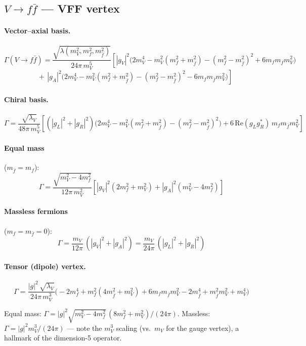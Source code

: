 \documentclass[11pt,a4paper]{article}
\newcommand{\la}{\lambda}
\newcommand{\beq}{\begin{equation}}
\newcommand{\eeq}{\end{equation}}
\newcommand{\conj}[1]{#1^{*}}
\begin{document}
\subsection{$V \to f\bar{f}$ --- VFF vertex}
\label{sec:V-ff}

\paragraph{Vector--axial basis.}
\beq
\boxed{
\Gamma(V\to f\bar{f}) = \frac{\sqrt{\la(m_V^2,m_f^2,m_{\bar{f}}^2)}}{24\pi\, m_V^5}
\left[|g_V|^2\bigl(2m_V^4-m_V^2(m_f^2+m_{\bar f}^2)-(m_f^2-m_{\bar f}^2)^2+6m_f m_{\bar f} m_V^2\bigr)
\right.}
\eeq
\beq
\boxed{
\left.\quad
+\,|g_A|^2\bigl(2m_V^4-m_V^2(m_f^2+m_{\bar f}^2)-(m_f^2-m_{\bar f}^2)^2-6m_f m_{\bar f} m_V^2\bigr)
\right]
}
\label{eq:V-ff-va}
\eeq

\paragraph{Chiral basis.}
\beq
\Gamma = \frac{\sqrt{\la_V}}{48\pi\, m_V^5}
\!\left[(|g_L|^2\!+\!|g_R|^2)\bigl(2m_V^4\!-\!m_V^2(m_f^2\!+\!m_{\bar f}^2)\!-\!(m_f^2\!-\!m_{\bar f}^2)^2\bigr)
+6\,\mathrm{Re}(g_L\conj{g_R})\,m_f m_{\bar f} m_V^2\right]
\label{eq:V-ff-ch}
\eeq

\paragraph{Equal mass} ($m_{\bar f}=m_f$):
\beq
\Gamma = \frac{\sqrt{m_V^2-4m_f^2}}{12\pi\, m_V^2}
\left[|g_V|^2(2m_f^2+m_V^2) + |g_A|^2(m_V^2-4m_f^2)\right]
\label{eq:V-ff-va-equal}
\eeq

\paragraph{Massless fermions} ($m_f=m_{\bar f}=0$):
\beq
\Gamma = \frac{m_V}{12\pi}\,(|g_V|^2+|g_A|^2) = \frac{m_V}{24\pi}\,(|g_L|^2+|g_R|^2)
\label{eq:V-ff-massless}
\eeq

\paragraph{Tensor (dipole) vertex.}
\beq
\boxed{
\Gamma = \frac{|g|^2\,\sqrt{\la_V}}{24\pi\, m_V^3}
\bigl(-2m_f^4+m_f^2(4m_{\bar f}^2+m_V^2)+6m_f m_{\bar f} m_V^2-2m_{\bar f}^4+m_{\bar f}^2 m_V^2+m_V^4\bigr)
}
\label{eq:V-ff-tensor}
\eeq

Equal mass: $\Gamma = |g|^2\sqrt{m_V^2-4m_f^2}\,(8m_f^2+m_V^2)/(24\pi)$.
Massless: $\Gamma = |g|^2 m_V^3/(24\pi)$ --- note the $m_V^3$ scaling (vs.\ $m_V$ for the gauge vertex),
a hallmark of the dimension-5 operator.
\end{document}
